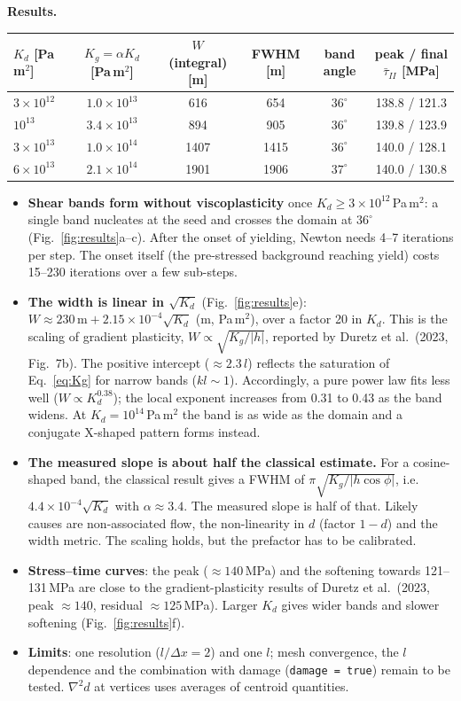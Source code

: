 \documentclass[10pt,a4paper]{article}
\begin{document}
\textbf{Results.}
\begin{table}[h]
\centering\small
\begin{tabular}{lccccc}
\toprule
$K_d$ [Pa\,m$^2$] & $K_g=\alpha K_d$ [Pa\,m$^2$] & $W$ (integral) [m] & FWHM [m] & band angle & peak / final $\bar\tau_{II}$ [MPa]\\
\midrule
$3\times10^{12}$ & $1.0\times10^{13}$ & 616  & 654  & $36^\circ$ & 138.8 / 121.3\\
$10^{13}$        & $3.4\times10^{13}$ & 894  & 905  & $36^\circ$ & 139.8 / 123.9\\
$3\times10^{13}$ & $1.0\times10^{14}$ & 1407 & 1415 & $36^\circ$ & 140.0 / 128.1\\
$6\times10^{13}$ & $2.1\times10^{14}$ & 1901 & 1906 & $37^\circ$ & 140.0 / 130.8\\
\bottomrule
\end{tabular}
\end{table}
\vspace{-0.2cm}
\begin{itemize}\setlength{\itemsep}{1pt}
\item \textbf{Shear bands form without viscoplasticity} once $K_d\ge3\times10^{12}$\,Pa\,m$^2$: a single band nucleates
at the seed and crosses the domain at $36^\circ$ (Fig.~\ref{fig:results}a--c). After the onset of yielding, Newton
needs 4--7 iterations per step. The onset itself (the pre-stressed background reaching yield) costs 15--230 iterations
over a few sub-steps.
\item \textbf{The width is linear in $\sqrt{K_d}$} (Fig.~\ref{fig:results}e):
$W \approx 230\,\mathrm{m} + 2.15\times10^{-4}\sqrt{K_d}$ (m, Pa\,m$^2$), over a factor 20 in $K_d$. This is the scaling of gradient plasticity, $W\propto\sqrt{K_g/|h|}$, reported by
Duretz et al.\ (2023, Fig.~7b). The positive intercept ($\approx2.3\,l$) reflects the saturation of
Eq.~\eqref{eq:Kg} for narrow bands ($kl\sim1$). Accordingly, a pure power law fits less well
($W\propto K_d^{0.38}$); the local exponent increases from 0.31 to 0.43 as the band widens. At
$K_d=10^{14}$\,Pa\,m$^2$ the band is as wide as the domain and a conjugate X-shaped pattern forms instead.
\item \textbf{The measured slope is about half the classical estimate.} For a cosine-shaped band, the classical
result gives a FWHM of $\pi\sqrt{K_g/|h\cos\phi|}$, i.e.\ $4.4\times10^{-4}\sqrt{K_d}$ with $\alpha\approx3.4$. The
measured slope is half of that. Likely causes are non-associated flow, the non-linearity in $d$ (factor $1-d$) and the
width metric. The scaling holds, but the prefactor has to be calibrated.
\item \textbf{Stress--time curves}: the peak ($\approx140$\,MPa) and the softening towards 121--131\,MPa are close to the
gradient-plasticity results of Duretz et al.\ (2023, peak $\approx140$, residual $\approx125$\,MPa). Larger $K_d$
gives wider bands and slower softening (Fig.~\ref{fig:results}f).
\item \textbf{Limits}: one resolution ($l/\Delta x=2$) and one $l$; mesh convergence, the $l$ dependence and the
combination with damage (\texttt{damage = true}) remain to be tested. $\nabla^2 d$ at vertices uses averages of
centroid quantities.
\end{itemize}
\end{document}
